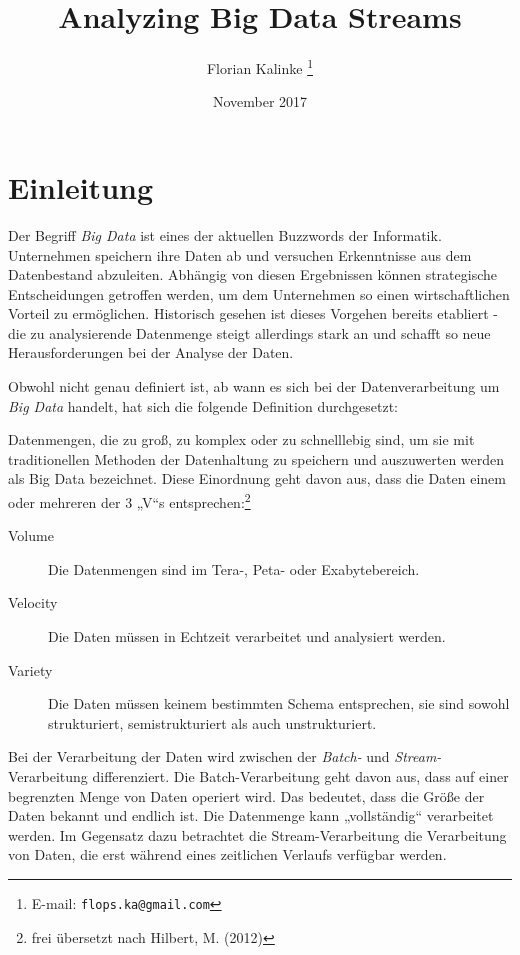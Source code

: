 \documentclass[a4paper,11pt]{scrartcl}
\begin{document}
\title{Analyzing Big Data Streams}
\author{Florian Kalinke%
  \thanks{E-mail: \texttt{flops.ka@gmail.com}}}
  \date{November 2017}
  \maketitle


  \tableofcontents

  \section{Einleitung}
  Der Begriff \textit{Big Data} ist eines der aktuellen Buzzwords der Informatik.
  Unternehmen speichern ihre Daten ab und versuchen Erkenntnisse aus dem
  Datenbestand abzuleiten. Abhängig von diesen Ergebnissen können strategische
  Entscheidungen getroffen werden, um dem Unternehmen so einen wirtschaftlichen
  Vorteil zu ermöglichen. Historisch gesehen ist dieses Vorgehen bereits
  etabliert - die zu analysierende Datenmenge steigt allerdings stark an und
  schafft so neue Herausforderungen bei der Analyse der
  Daten.\cite[S.~1]{freiknecht2014}

  Obwohl nicht genau definiert ist, ab wann es sich bei der Datenverarbeitung um
  \textit{Big Data} handelt, hat sich die folgende Definition durchgesetzt:

  Datenmengen, die zu groß, zu komplex oder zu schnelllebig sind, um sie mit
  traditionellen Methoden der Datenhaltung zu speichern und auszuwerten werden
  als Big Data bezeichnet. Diese Einordnung geht davon aus, dass die Daten einem
  oder mehreren der 3 „V“s entsprechen:\footnote{frei übersetzt nach Hilbert,
  M. (2012)}
  \begin{description}
    \item[Volume] Die Datenmengen sind im Tera-, Peta- oder Exabytebereich.
    \item[Velocity] Die Daten müssen in Echtzeit verarbeitet und analysiert
      werden.
    \item[Variety] Die Daten müssen keinem bestimmten Schema entsprechen, sie
      sind sowohl strukturiert, semistrukturiert als auch unstrukturiert.
  \end{description}

  Bei der Verarbeitung der Daten wird zwischen der \textit{Batch-} und
  \textit{Stream-}Verarbeitung differenziert. Die Batch-Verarbeitung geht davon
  aus, dass auf einer begrenzten Menge von Daten operiert wird. Das bedeutet,
  dass die Größe der Daten bekannt und endlich ist. Die Datenmenge kann
  „vollständig“ verarbeitet werden. Im Gegensatz dazu betrachtet die
  Stream-Verarbeitung die Verarbeitung von Daten, die erst während eines
  zeitlichen Verlaufs verfügbar werden.\cite[S.~439]{kleppmann17}
\end{document}

